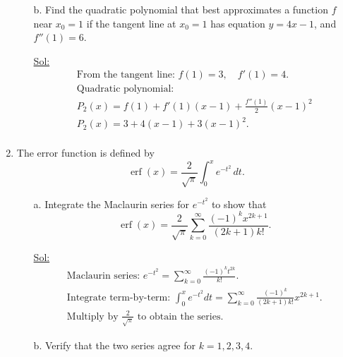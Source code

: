\begin{enumerate}
\begin{itemize}
    \item[b.] Find the quadratic polynomial that best approximates a
      function \( f \) near \( x_0 = 1 \) if the tangent line at \(
      x_0 = 1 \) has equation \( y = 4x - 1 \), and \( f''(1) = 6 \).

      \underline{Sol:}\\
      \[
        \begin{array}{l}
          \textrm{From the tangent line: } f(1) = 3, \quad f'(1) = 4. \\
          \textrm{Quadratic polynomial: } \\
          P_2(x) = f(1) + f'(1)(x-1) + \frac{f''(1)}{2}(x-1)^2 \\
          P_2(x) = 3 + 4(x-1) + 3(x-1)^2.\\


        \end{array}
      \]
      \bigbreak
  \end{itemize}

\item The error function is defined by
  \[
    \operatorname{erf}(x) = \frac{2}{\sqrt{\pi}} \int_0^x e^{-t^2} \, dt.
  \]
  \begin{itemize}
    \item[a.] Integrate the Maclaurin series for \( e^{-t^2} \) to show that
      \[
        \operatorname{erf}(x) = \frac{2}{\sqrt{\pi}}
        \sum_{k=0}^{\infty} \frac{(-1)^k x^{2k+1}}{(2k+1)k!}.
      \]

      \underline{Sol:}\\
      \[
        \begin{array}{l}
          \textrm{Maclaurin series: } e^{-t^2} = \sum_{k=0}^\infty
          \frac{(-1)^k t^{2k}}{k!}. \\
          \textrm{Integrate term-by-term: } \int_0^x e^{-t^2} dt =
          \sum_{k=0}^\infty \frac{(-1)^k}{(2k+1)k!} x^{2k+1}. \\
          \textrm{Multiply by } \frac{2}{\sqrt{\pi}} \textrm{ to
          obtain the series.}
        \end{array}
      \]
      \bigbreak

    \item[b.] Verify that the two series agree for \( k = 1, 2, 3, 4 \).


\end{itemize}
\end{enumerate}
